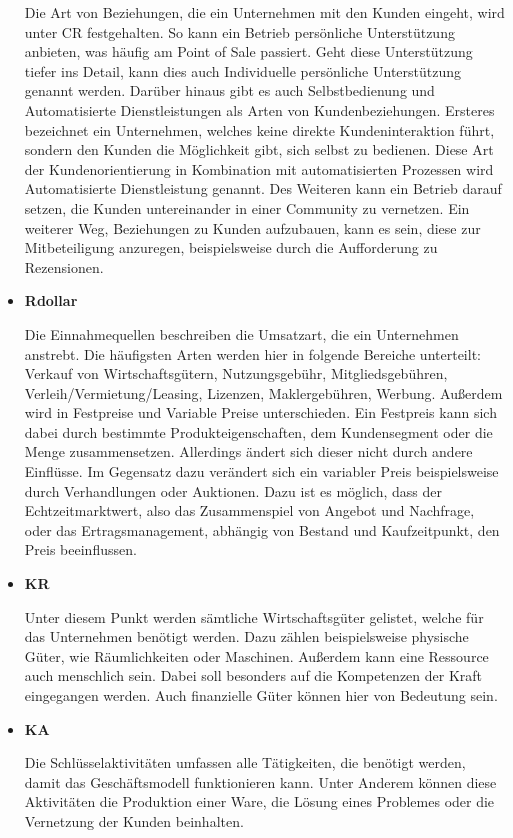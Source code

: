 \begin{itemize}
	Die Art von Beziehungen, die ein Unternehmen mit den Kunden eingeht, wird unter \ac{CR} festgehalten. So kann ein Betrieb persönliche Unterstützung anbieten, was häufig am Point of Sale passiert. Geht diese Unterstützung tiefer ins Detail, kann dies auch Individuelle persönliche Unterstützung genannt werden. Darüber hinaus gibt es auch Selbstbedienung und Automatisierte Dienstleistungen als Arten von Kundenbeziehungen. Ersteres bezeichnet ein Unternehmen, welches keine direkte Kundeninteraktion führt, sondern den Kunden die Möglichkeit gibt, sich selbst zu bedienen. Diese Art der Kundenorientierung in Kombination mit automatisierten Prozessen wird Automatisierte Dienstleistung genannt. Des Weiteren kann ein Betrieb darauf setzen, die Kunden untereinander in einer Community zu vernetzen. Ein weiterer Weg, Beziehungen zu Kunden aufzubauen, kann es sein, diese zur Mitbeteiligung anzuregen, beispielsweise durch die Aufforderung zu Rezensionen.
	
	\item \textbf{\ac{Rdollar}}
	
	Die Einnahmequellen beschreiben die Umsatzart, die ein Unternehmen anstrebt. Die häufigsten Arten werden hier in folgende Bereiche unterteilt: Verkauf von Wirtschaftsgütern, Nutzungsgebühr, Mitgliedsgebühren, Verleih/Vermietung/Leasing, Lizenzen, Maklergebühren, Werbung. Außerdem wird in Festpreise und Variable Preise unterschieden. Ein Festpreis kann sich dabei durch bestimmte Produkteigenschaften, dem Kundensegment oder die Menge zusammensetzen. Allerdings ändert sich dieser nicht durch andere Einflüsse. Im Gegensatz dazu verändert sich ein variabler Preis beispielsweise durch Verhandlungen oder Auktionen. Dazu ist es möglich, dass der Echtzeitmarktwert, also das Zusammenspiel von Angebot und Nachfrage, oder das Ertragsmanagement, abhängig von Bestand und Kaufzeitpunkt, den Preis beeinflussen.
	
	
	\item \textbf{\ac{KR}}
	
	Unter diesem Punkt werden sämtliche Wirtschaftsgüter gelistet, welche für das Unternehmen benötigt werden. Dazu zählen beispielsweise physische Güter, wie Räumlichkeiten oder Maschinen. Außerdem kann eine Ressource auch menschlich sein. Dabei soll besonders auf die Kompetenzen der Kraft eingegangen werden. Auch finanzielle Güter können hier von Bedeutung sein.
	
	\item \textbf{\ac{KA}}
	
	Die Schlüsselaktivitäten umfassen alle Tätigkeiten, die benötigt werden, damit das Geschäftsmodell funktionieren kann. Unter Anderem können diese Aktivitäten die Produktion einer Ware, die Lösung eines Problemes oder die Vernetzung der Kunden beinhalten. 
	

\end{itemize}

